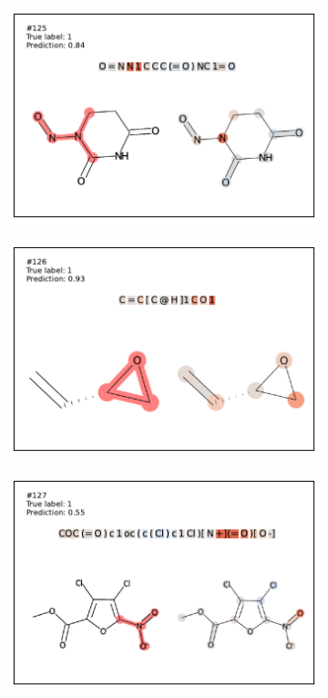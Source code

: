 \begin{figure}
\begin{subfigure}[b]{0.33\textwidth}
\end{subfigure} 
\begin{subfigure}[b]{0.33\textwidth} 
  \centering 
  \includegraphics[width=\textwidth]{figures/ames/ames125.pdf} 
\end{subfigure}\begin{subfigure}[b]{0.33\textwidth} 
  \centering 
  \includegraphics[width=\textwidth]{figures/ames/ames126.pdf} 
\end{subfigure}\begin{subfigure}[b]{0.33\textwidth} 
  \centering 
  \includegraphics[width=\textwidth]{figures/ames/ames127.pdf} 

\end{subfigure}
\end{figure}
